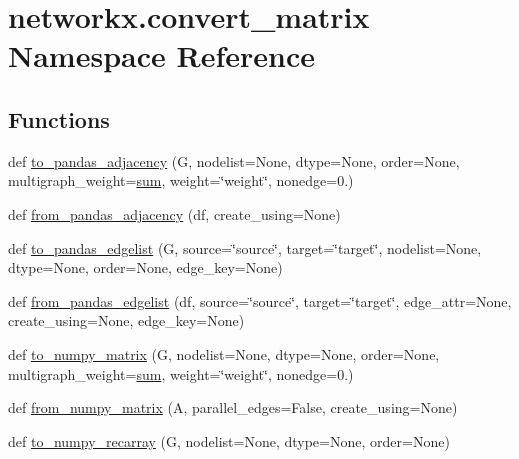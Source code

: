 \hypertarget{namespacenetworkx_1_1convert__matrix}{}\section{networkx.\+convert\+\_\+matrix Namespace Reference}
\label{namespacenetworkx_1_1convert__matrix}
\subsection*{Functions}
\begin{DoxyCompactItemize}
\item 
def \hyperlink{namespacenetworkx_1_1convert__matrix_a0153ce03fb37943dab6046e07b4bffc0}{to\+\_\+pandas\+\_\+adjacency} (G, nodelist=None, dtype=None, order=None, multigraph\+\_\+weight=\hyperlink{assumed__shape_2foo__free_8f90_a1c860bb40bf43c289bc16f8634733f9a}{sum}, weight=\char`\"{}weight\char`\"{}, nonedge=0.)
\item 
def \hyperlink{namespacenetworkx_1_1convert__matrix_a566eb7823aed0eeb25556218a8aac8aa}{from\+\_\+pandas\+\_\+adjacency} (df, create\+\_\+using=None)
\item 
def \hyperlink{namespacenetworkx_1_1convert__matrix_a6f3984434d922d8f5ee4fc1aff940004}{to\+\_\+pandas\+\_\+edgelist} (G, source=\char`\"{}source\char`\"{}, target=\char`\"{}target\char`\"{}, nodelist=None, dtype=None, order=None, edge\+\_\+key=None)
\item 
def \hyperlink{namespacenetworkx_1_1convert__matrix_a985798534d023762687a19185c0eb578}{from\+\_\+pandas\+\_\+edgelist} (df, source=\char`\"{}source\char`\"{}, target=\char`\"{}target\char`\"{}, edge\+\_\+attr=None, create\+\_\+using=None, edge\+\_\+key=None)
\item 
def \hyperlink{namespacenetworkx_1_1convert__matrix_a3a9192800f2d95a6d3588aa9e4516d20}{to\+\_\+numpy\+\_\+matrix} (G, nodelist=None, dtype=None, order=None, multigraph\+\_\+weight=\hyperlink{assumed__shape_2foo__free_8f90_a1c860bb40bf43c289bc16f8634733f9a}{sum}, weight=\char`\"{}weight\char`\"{}, nonedge=0.)
\item 
def \hyperlink{namespacenetworkx_1_1convert__matrix_aac4b5517e3ce3b24f975ca22e5c52751}{from\+\_\+numpy\+\_\+matrix} (A, parallel\+\_\+edges=False, create\+\_\+using=None)
\item 
def \hyperlink{namespacenetworkx_1_1convert__matrix_ad41194dd5380831f9c70606b71bb3b07}{to\+\_\+numpy\+\_\+recarray} (G, nodelist=None, dtype=None, order=None)
\item 

\end{DoxyCompactItemize}
